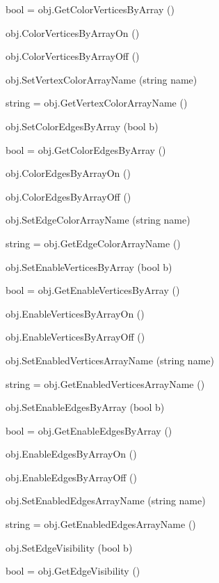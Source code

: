 \begin{DoxyItemize}
\item {\ttfamily bool = obj.\-Get\-Color\-Vertices\-By\-Array ()}  
\item {\ttfamily obj.\-Color\-Vertices\-By\-Array\-On ()}  
\item {\ttfamily obj.\-Color\-Vertices\-By\-Array\-Off ()}  
\item {\ttfamily obj.\-Set\-Vertex\-Color\-Array\-Name (string name)}  
\item {\ttfamily string = obj.\-Get\-Vertex\-Color\-Array\-Name ()}  
\item {\ttfamily obj.\-Set\-Color\-Edges\-By\-Array (bool b)}  
\item {\ttfamily bool = obj.\-Get\-Color\-Edges\-By\-Array ()}  
\item {\ttfamily obj.\-Color\-Edges\-By\-Array\-On ()}  
\item {\ttfamily obj.\-Color\-Edges\-By\-Array\-Off ()}  
\item {\ttfamily obj.\-Set\-Edge\-Color\-Array\-Name (string name)}  
\item {\ttfamily string = obj.\-Get\-Edge\-Color\-Array\-Name ()}  
\item {\ttfamily obj.\-Set\-Enable\-Vertices\-By\-Array (bool b)}  
\item {\ttfamily bool = obj.\-Get\-Enable\-Vertices\-By\-Array ()}  
\item {\ttfamily obj.\-Enable\-Vertices\-By\-Array\-On ()}  
\item {\ttfamily obj.\-Enable\-Vertices\-By\-Array\-Off ()}  
\item {\ttfamily obj.\-Set\-Enabled\-Vertices\-Array\-Name (string name)}  
\item {\ttfamily string = obj.\-Get\-Enabled\-Vertices\-Array\-Name ()}  
\item {\ttfamily obj.\-Set\-Enable\-Edges\-By\-Array (bool b)}  
\item {\ttfamily bool = obj.\-Get\-Enable\-Edges\-By\-Array ()}  
\item {\ttfamily obj.\-Enable\-Edges\-By\-Array\-On ()}  
\item {\ttfamily obj.\-Enable\-Edges\-By\-Array\-Off ()}  
\item {\ttfamily obj.\-Set\-Enabled\-Edges\-Array\-Name (string name)}  
\item {\ttfamily string = obj.\-Get\-Enabled\-Edges\-Array\-Name ()}  
\item {\ttfamily obj.\-Set\-Edge\-Visibility (bool b)}  
\item {\ttfamily bool = obj.\-Get\-Edge\-Visibility ()}  

\end{DoxyItemize}
